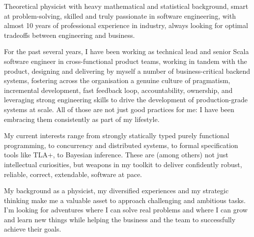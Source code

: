 
\begin{cvparagraph}
Theoretical physicist with heavy mathematical and statistical 
background, smart at problem-solving, skilled and truly passionate in software engineering, with almost 10 years of professional experience in industry, always looking for optimal tradeoffs between engineering and business.

  For the past several years, I have been working as technical lead and senior Scala software engineer in cross-functional product teams, working in tandem with the product, designing and delivering by myself a number of business-critical backend systems, fostering  across the organisation a genuine culture of pragmatism, incremental development, fast feedback loop, accountability, ownership, and leveraging strong engineering skills 
  to drive the development of production-grade systems at scale. All of those are not just good practices for me: I have been embracing them consistently as part of my lifestyle.

  My current interests range from strongly statically typed purely functional programming, to concurrency and distributed systems, to formal specification tools like TLA+, to Bayesian inference. These are (among others) not just intellectual curiosities, but weapons in my toolkit to deliver confidently robust, reliable, correct, extendable, software at pace. 

My background as a physicist, my diversified experiences and my strategic thinking make me a valuable asset to approach challenging and ambitious tasks. I'm looking for adventures where I can solve real problems and where I can grow and learn new things while helping the business and the team to successfully achieve their goals. 
\end{cvparagraph}
